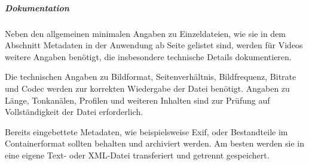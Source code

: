 \subparagraph{Dokumentation} Neben den allgemeinen minimalen Angaben zu Einzeldateien, wie sie in dem Abschnitt Metadaten in der Anwendung ab Seite \pageref{Metadaten-anwendung} gelistet sind, werden für Videos weitere Angaben benötigt, die insbesondere technische Details dokumentieren.

Die technischen Angaben zu Bildformat, Seitenverhältnis, Bildfrequenz, Bitrate und Codec werden zur korrekten Wiedergabe der Datei benötigt. Angaben zu Länge, Tonkanälen, Profilen und weiteren Inhalten sind zur Prüfung auf Vollständigkeit der Datei erforderlich.

Bereits eingebettete Metadaten, wie beispielsweise Exif, oder Bestandteile im Containerformat sollten behalten und archiviert werden. Am besten werden sie in eine eigene Text- oder XML-Datei transferiert und getrennt gespeichert.

